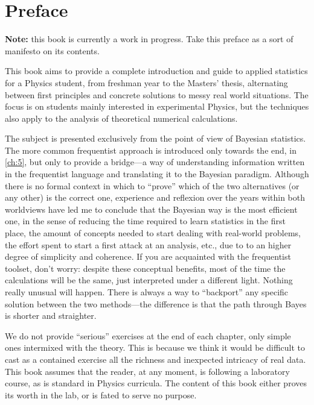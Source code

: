 \chapter{Preface}

\textbf{Note:} this book is currently a work in progress. Take this preface as
a sort of manifesto on its contents.

This book aims to provide a complete introduction and guide to applied
statistics for a Physics student, from freshman year to the Masters' thesis,
alternating between first principles and concrete solutions to messy real world
situations. The focus is on students mainly interested in experimental Physics,
but the techniques also apply to the analysis of theoretical numerical
calculations.

The subject is presented exclusively from the point of view of Bayesian
statistics. The more common frequentist approach is introduced only towards the
end, in \autoref{ch:5}, but only to provide a bridge---a way of understanding
information written in the frequentist language and translating it to the
Bayesian paradigm. Although there is no formal context in which to ``prove''
which of the two alternatives (or any other) is the correct one, experience and
reflexion over the years within both worldviews have led me to conclude that
the Bayesian way is the most efficient one, in the sense of reducing the time
required to learn statistics in the first place, the amount of concepts needed
to start dealing with real-world problems, the effort spent to start a first
attack at an analysis, etc., due to to an higher degree of simplicity and
coherence. If you are acquainted with the frequentist toolset, don't worry:
despite these conceptual benefits, most of the time the calculations will be
the same, just interpreted under a different light. Nothing really unusual will
happen. There is always a way to ``backport'' any specific solution between the
two methods---the difference is that the path through Bayes is shorter and
straighter.

We do not provide ``serious'' exercises at the end of each chapter, only simple
ones intermixed with the theory. This is because we think it would be difficult
to cast as a contained exercise all the richness and inexpected intricacy of
real data. This book assumes that the reader, at any moment, is following a
laboratory course, as is standard in Physics curricula. The content of this
book either proves its worth in the lab, or is fated to serve no purpose.

